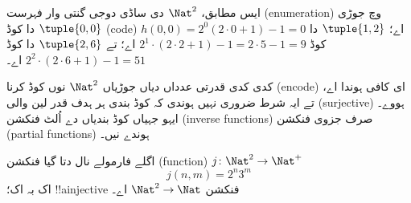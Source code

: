 \documentclass[../../../include/open-logic-section]{subfiles}
\begin{document}
\begin{explain}
ایس مطابق، $\Nat^2$ دی ساڈی دوجی گنتی وار فہرست (enumeration) وچ جوڑی
$\tuple{0,0}$ دا کوڈ (code) $h(0,0) = 2^0(2\cdot 0+1) - 1 = 0$ اے؛
$\tuple{1,2}$ دا کوڈ $2^{1} \cdot (2 \cdot 2 + 1) - 1 = 2
\cdot 5 - 1 = 9$ اے؛ تے $\tuple{2,6}$ دا کوڈ $2^{2} \cdot (2
\cdot 6 + 1) - 1 = 51$ اے۔
\end{explain}

کدی کدی قدرتی عدداں دیاں جوڑیاں $\Nat^2$ نوں کوڈ کرنا (encode) ای کافی
ہوندا اے، تے ایہ شرط ضروری نہیں ہوندی کہ کوڈ بندی ہر ہدف قدر لین والی
(surjective) ہووے۔ ایہو جہیاں کوڈ بندیاں دے اُلٹ فنکشن (inverse functions)
صرف جزوی فنکشن (partial functions) ہوندے نیں۔

\begin{ex}
اگلے فارمولے نال دتا گیا فنکشن (function) $j\colon \Nat^2 \to \Nat^+$
\[
j(n,m) = 2^n3^m
\]
اک بہ اک؛ !!a{injective} فنکشن $\Nat^2 \to \Nat$ اے۔
\end{ex}
\end{document}
